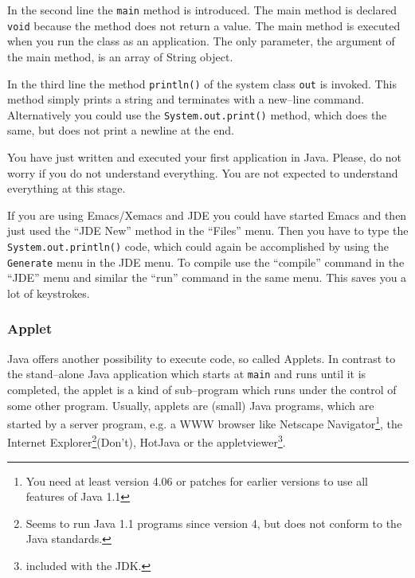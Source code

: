 In the second line the \verb|main| method is introduced. The main
method is declared \verb|void| because the method does not return a
value. The main method is executed when you run the class as an
application. The only parameter, the argument
of the main method, is an array of String object.

In the third line the method \verb|println()| of the system class 
\verb|out|
is invoked. This method simply prints a string and terminates with a 
new--line command. Alternatively you could use the 
\verb|System.out.print()| method, which does the same, but does
not print a newline at the end. 

You have just written and executed your first application in
Java. Please, do not worry if you do not understand everything. You are
not expected to understand everything at this stage.

If you are using Emacs/Xemacs and JDE you could have started Emacs and
then just used the ``JDE New'' method in the ``Files'' menu. Then you
have to type the \verb|System.out.println()| code, which could
again be accomplished by using the \verb|Generate| menu in the
JDE menu. To compile
use the ``compile'' command in the ``JDE'' menu and similar
the ``run'' command in the same menu. This saves you a lot of keystrokes. 

\subsubsection{Applet}
\label{sec:Applet}

Java offers another possibility to execute code, so called Applets.
In contrast to the stand--alone Java application which starts at
\verb!main! and runs until it is completed, the applet is a kind of
sub--program which runs under the control of some other program.
Usually, applets are (small) Java programs, which are started by a 
server program,
e.g. a WWW browser like Netscape Navigator\footnote{You need at least 
version 4.06 or patches for earlier versions to use all features of Java 1.1}, 
the Internet Explorer\footnote{Seems to run Java 1.1 programs since
version 4, but does not conform to the Java standards.}(Don't),
HotJava or the appletviewer\footnote{included with the JDK.}.

